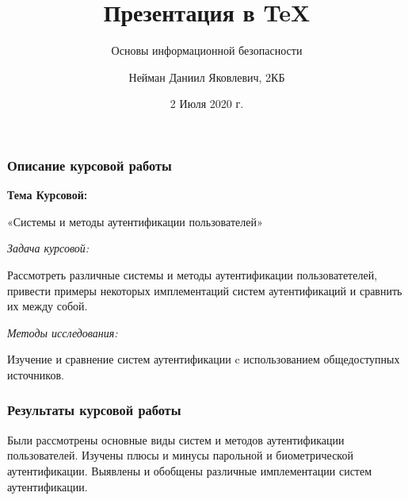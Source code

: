 \documentclass{beamer}
\title{Презентация в TeX}
\subtitle{Основы информационной безопасности}
\author{Нейман Даниил Яковлевич, 2КБ}
\institute{БФУ им. И. Канта}
\date{2 Июля 2020 г.}
\begin{document}
\frame{\titlepage}
\begin{frame}
	
\begin{center}
	
\frametitle{Описание курсовой работы}
\end{center}

\begin{center}
	\textbf{Тема Курсовой:}
	
\end{center}
«Системы и методы аутентификации пользователей»

\begin{center}
	{\textit{Задача курсовой:}}
	
\end{center}
Рассмотреть различные системы и методы аутентификации пользоватетелей, привести примеры некоторых имплементаций систем аутентификаций и сравнить их между собой.

\begin{center}
	{\textit{Методы исследования:}}
	
\end{center}
Изучение и сравнение систем аутентификации c использованием общедоступных источников.

\end{frame}

\begin{frame}
	
\frametitle{Результаты курсовой работы}
Были рассмотрены основные виды систем и методов аутентификации пользователей. Изучены плюсы и минусы парольной и биометрической аутентификации. Выявлены и обобщены различные имплементации систем аутентификации.


\end{frame}
\end{document}
